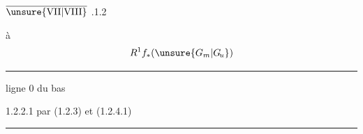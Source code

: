 \uline{$\overline{\unsure{\mathrm{VII}|\mathrm{VIII}}}$} .1.2 

à 
\[
R^1 f_*(\unsure{G_m|G_{\!u}})
\]

\par\noindent\hspace*{1em}\rule{.65\linewidth}{.2pt}

ligne 0 du bas

 1.2.2.1 par (1.2.3) et (1.2.4.1)

\par\noindent\hspace*{1em}\rule{.24\linewidth}{.2pt}
